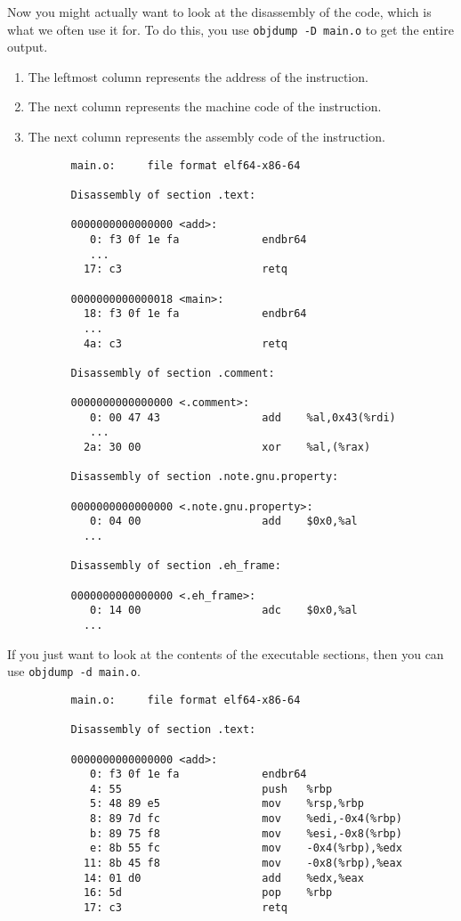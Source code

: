       \begin{theorem}
        Now you might actually want to look at the disassembly of the code, which is what we often use it for. To do this, you use \texttt{objdump -D main.o} to get the entire output. 
        \begin{enumerate}
          \item The leftmost column represents the address of the instruction. 
          \item The next column represents the machine code of the instruction. 
          \item The next column represents the assembly code of the instruction. 
        \end{enumerate}
        \begin{lstlisting}
          main.o:     file format elf64-x86-64

          Disassembly of section .text:

          0000000000000000 <add>:
             0:	f3 0f 1e fa          	endbr64 
             ...
            17:	c3                   	retq   

          0000000000000018 <main>:
            18:	f3 0f 1e fa          	endbr64 
            ...
            4a:	c3                   	retq   

          Disassembly of section .comment:

          0000000000000000 <.comment>:
             0:	00 47 43             	add    %al,0x43(%rdi)
             ...
            2a:	30 00                	xor    %al,(%rax)

          Disassembly of section .note.gnu.property:

          0000000000000000 <.note.gnu.property>:
             0:	04 00                	add    $0x0,%al
            ...

          Disassembly of section .eh_frame:

          0000000000000000 <.eh_frame>:
             0:	14 00                	adc    $0x0,%al
            ...
        \end{lstlisting}
        If you just want to look at the contents of the executable sections, then you can use \texttt{objdump -d main.o}.
        \begin{lstlisting}
          main.o:     file format elf64-x86-64

          Disassembly of section .text:

          0000000000000000 <add>:
             0:	f3 0f 1e fa          	endbr64 
             4:	55                   	push   %rbp
             5:	48 89 e5             	mov    %rsp,%rbp
             8:	89 7d fc             	mov    %edi,-0x4(%rbp)
             b:	89 75 f8             	mov    %esi,-0x8(%rbp)
             e:	8b 55 fc             	mov    -0x4(%rbp),%edx
            11:	8b 45 f8             	mov    -0x8(%rbp),%eax
            14:	01 d0                	add    %edx,%eax
            16:	5d                   	pop    %rbp
            17:	c3                   	retq   


\end{lstlisting}
\end{theorem}
